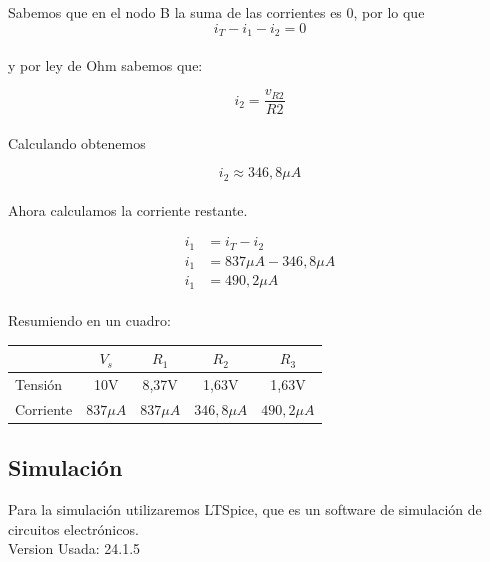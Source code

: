 \documentclass[a4paper,12pt]{article}
\begin{document}
Sabemos que en el nodo  B la suma de las corrientes es 0, por lo que\\

$$i_T - i_1 - i_2 = 0$$ \\

y por ley de Ohm sabemos que:

$$i_2 = \frac{v_{R2}}{R2}$$\\

Calculando obtenemos

$$i_2 \approx 346,8\mu A$$\\

Ahora calculamos la corriente restante.

\begin{align*}
    i_1 &= i_T - i_2 \\[0.5cm]
    i_1 &= 837 \mu A - 346,8 \mu A\\[0.5cm]
    i_1 &= 490,2 \mu A
\end{align*}

\paragraph{}

Resumiendo en un cuadro:\\

\vspace{0.5cm}


\begin{table}[h]  %
\centering
\begin{tabular}{|l|c|c|c|c|}
\hline
                &  $V_s$&  $R_1$&  $R_2$& $R_3$\\ \hline  
         Tensión&  10V&  8,37V&  1,63V& 1,63V\\ \hline  
         Corriente&  $837 \mu A$&  $837 \mu A$&  $346,8 \mu A$& $490,2 \mu A$\\ \hline 
\end{tabular}
\end{table}

\vspace{0.5cm}

\subsection{Simulación}

Para la simulación utilizaremos LTSpice, que es un software de simulación de circuitos electrónicos.
\\
Version Usada: 24.1.5
\end{document}

